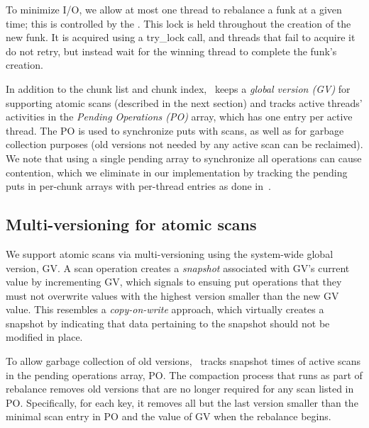 To minimize I/O, we allow at most one thread to rebalance a funk at a given time; this is controlled by 
the  . 
This lock is held throughout the creation of the new funk. 
It is acquired using a try\_lock call, and threads that fail to acquire it do not retry, but instead wait for the winning thread to complete the funk's creation.

In addition to the chunk list and chunk index, \sys\ keeps a \emph{global version (GV)} for supporting atomic scans (described in the next section) and tracks active threads' activities in the 
\emph{Pending Operations (PO)} array, which has one entry per active thread. 
The PO is used to synchronize puts with scans, as well as for  garbage collection purposes (old 
versions not needed by any active scan can be reclaimed).
We note that using a single pending array to synchronize all operations can cause contention, which we
eliminate in our implementation by tracking the pending puts in per-chunk arrays with per-thread entries as done in~\cite{kiwi}.

\subsection{Multi-versioning for atomic scans}
\label{ssec:scans}

We support atomic scans via multi-versioning using the system-wide global version, GV. 
A scan operation creates a \emph{snapshot} associated with GV's current value by incrementing GV, 
which signals to ensuing put operations that they must not overwrite values  with the highest
version smaller than the new GV value.
This resembles a \emph{copy-on-write} approach, which virtually creates a snapshot by 
indicating that data pertaining to the snapshot should not be modified in place.  

To allow garbage collection of old versions, \sys\  tracks snapshot times of 
active scans in the pending operations array, PO.
The compaction process that runs as part of rebalance removes old versions that are no longer required for any  
scan listed in PO. Specifically, for each key, it removes all but the last version smaller than the minimal
scan entry in PO and the value of GV when the rebalance begins. 


